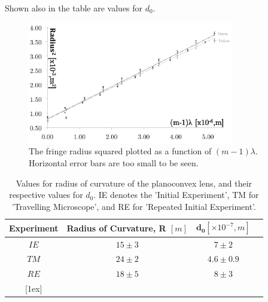 \documentclass[twocolumn]{revtex4}
\newcommand{\squeezeup}{\vspace{-2.5mm}}
\begin{document}
Shown also in the table are values for $d_0$. 
\vspace{-1ex}
\begin{figure}[!h]
\begin{center}
\includegraphics[width=9cm]{fig2}
\caption[]{The fringe radius squared plotted as a function of $(m-1)\lambda$. Horizontal error bars are too small to be seen.}
\label{fig:fig2}
\end{center}
\end{figure}

\squeezeup
\squeezeup
\squeezeup

\begin{table}[h!]
\centering
\begin{tabular}{ |c|c|c|c| } 
 \hline
 \textbf{Experiment} & \textbf{Radius of Curvature, R $[m]$} & $\boldsymbol{d_0} [\times10^{-7}, m]$ \\ [0.5ex] 
 \hline\hline
 $IE$ &$15\pm3$ & $7\pm2$ \\ 
 $TM$ & $24\pm2$ & $4.6\pm0.9$ \\
 $RE$ & $18\pm5$ & $8\pm3$ \\
 [1ex] 
 
 \hline
\end{tabular}
\caption{Values for radius of curvature of the planoconvex lens, and their respective values for $d_0$. IE denotes the 'Initial Experiment', TM for 'Travelling Microscope', and RE for 'Repeated Initial Experiment'.}
\label{table:1}
\end{table}
\squeezeup
\squeezeup
\squeezeup
\end{document}
